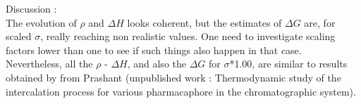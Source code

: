 \documentclass[12pt,a4paper]{article}
\begin{document}
Discussion : \\


The evolution of $\rho$ and $\Delta H$ looks coherent, but the estimates of 
$\Delta G$ are, for scaled  $\sigma$, really reaching non realistic values. One need to investigate 
scaling factors lower than one to see if such things also happen in that case.\\



Nevertheless, all the $\rho$ - $\Delta H$, and also the $\Delta G$ for $\sigma$*1.00, are similar 
to results obtained by from Prashant (unpublished work : Thermodynamic study of the intercalation 
process for various
pharmacaphore in the chromatographic system).
\end{document}
